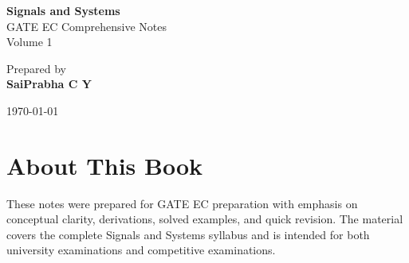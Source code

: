 \documentclass[12pt,a4paper]{book}
\begin{document}
\begin{titlepage}
\centering
\vspace*{3cm}

{\Huge \textbf{Signals and Systems}}\\[1cm]

{\Large GATE EC Comprehensive Notes}\\[0.5cm]

{\Large Volume 1}\\[2cm]

\vfill

{\large Prepared by}\\[0.3cm]
{\Large \textbf{SaiPrabha C Y}}\\[2cm]

\vfill

{\large \today}

\end{titlepage}

\frontmatter

\tableofcontents
\clearpage

\mainmatter















\backmatter

\chapter*{About This Book}

These notes were prepared for GATE EC preparation with emphasis on conceptual
clarity, derivations, solved examples, and quick revision. The material covers
the complete Signals and Systems syllabus and is intended for both university
examinations and competitive examinations.
\end{document}
